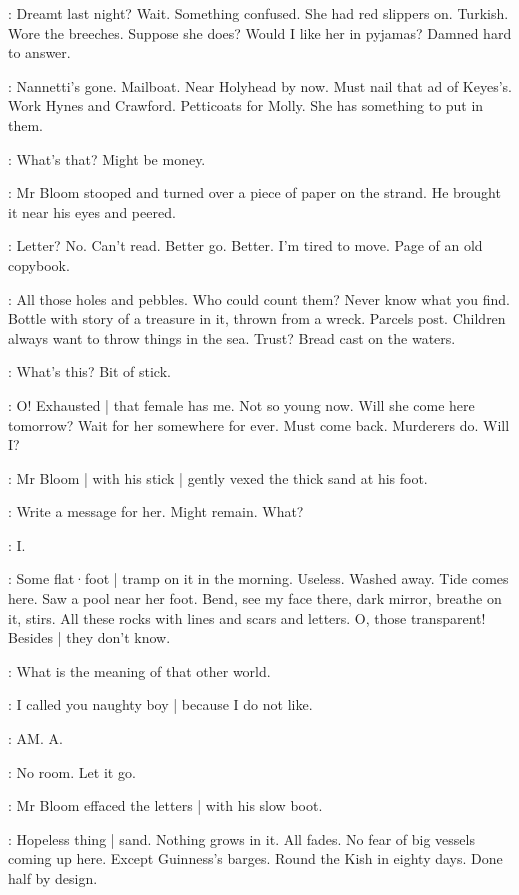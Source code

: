 \BloomHist:
Dreamt last night?
Wait.%
Something confused.
She had red slippers on.
Turkish.
Wore the breeches.
Suppose she does?
Would I like her in pyjamas?
Damned hard to answer.

\BloomToday:
Nannetti's gone.
Mailboat.
Near Holyhead by now.
Must nail that ad of Keyes's.
Work Hynes and Crawford.
Petticoats for Molly.
She has something to put in them.

\BloomCurrent:
What's that?
Might be money.

:
Mr Bloom stooped
and turned over a piece of paper
on the strand.
He brought it near his eyes and peered.

\BloomCurrent:
Letter?
No.
Can't read.
Better go.
Better.
I'm tired to move.
Page of an old copybook.

\BloomAbstract:
All those holes and pebbles.
Who could count them?
Never know what you find.
Bottle with story of a treasure in it,
thrown from a wreck.%
Parcels post.
Children always want to throw things in the sea.
Trust?
Bread cast on the waters.

\BloomCurrent:
What's this?
Bit of stick.

\BloomCurrent:
O!
Exhausted |
that female has me.
Not so young now.
Will she come here tomorrow?
Wait for her somewhere for ever.
Must come back.
Murderers do.
Will I?

:
Mr Bloom |
with his stick |
gently vexed the thick sand at his foot.

\BloomCurrent:
Write a message for her.
Might remain.
What?

\BloomCurrent:
I.

\BloomCurrent:
Some flat·foot |
tramp on it in the morning.
Useless.
Washed away.
Tide comes here.%
Saw a pool near her foot.
Bend,
see my face there,
dark mirror,
breathe on it,
stirs.
All these rocks
with lines and scars and letters.
O,
those transparent!
Besides |
they don't know.

\BloomToday:
What is the meaning of that other world.

\BloomOther:
I called you naughty boy |
because I do not like.

\BloomCurrent:
AM.
A.

\BloomCurrent:
No room.
Let it go.

:
Mr Bloom effaced the letters |
with his slow boot.

\BloomAbstract:
Hopeless thing |
sand.
Nothing grows in it.
All fades.
No fear of big vessels coming up here.
Except Guinness's barges.
Round the Kish in eighty days.
Done half by design.

